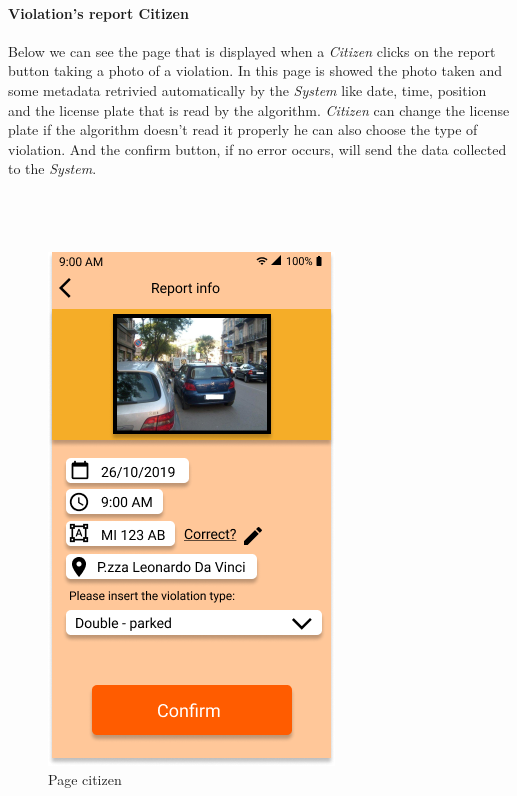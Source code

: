 \documentclass{article}
\begin{document}
\paragraph{Violation's report Citizen}
Below we can see the page that is displayed when a \textit{Citizen} clicks on the report button taking a photo of a
violation. In this page is showed the photo taken and some metadata retrivied automatically by the \textit{System} like
date, time, position and the license plate that is read by the algorithm. \textit{Citizen} can change the license plate
if the algorithm doesn't read it properly he can also choose the type of violation. And the confirm button, if no error
occurs, will send the data collected to the \textit{System}.
\\
\\
\\
\\
\begin{figure}[H]
    \centering
    \includegraphics[scale=0.5]{img/mockups/page_citizen.png}
    \caption{Page citizen}
\end{figure}

\clearpage
\end{document}
